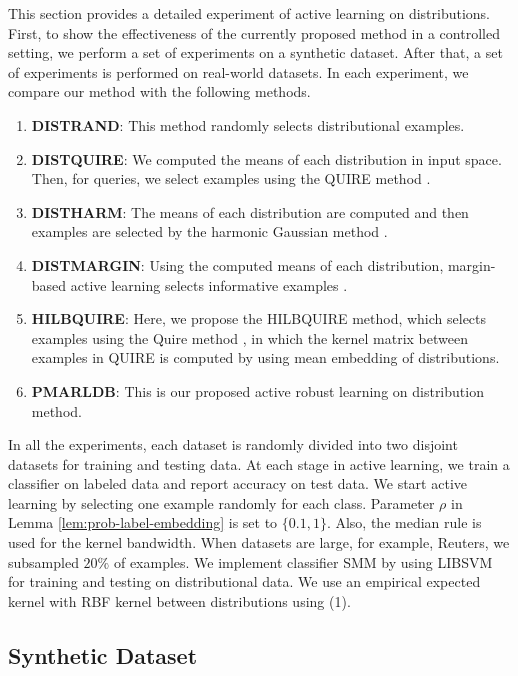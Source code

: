 \documentclass[10pt,twocolumn]{IEEEtran}
\begin{document}
	This section provides a detailed experiment of active learning on distributions. First, to show the effectiveness of the currently proposed method in a controlled setting, we perform a set of experiments on a synthetic dataset. After that, a set of experiments is performed on real-world datasets. In each experiment, we compare our method with the following methods.
	\begin{enumerate}
		\item \textbf{DISTRAND}: This method randomly selects distributional examples.
		\item \textbf{DISTQUIRE}: We computed the means of each distribution in input space. Then, for queries, we select examples using the QUIRE method \cite{huang2014active}.
		\item \textbf{DISTHARM}: The means of each distribution are computed and then examples are selected by the harmonic Gaussian method \cite{zhu2003semi}.
		\item \textbf{DISTMARGIN}: Using the computed means of each distribution, margin-based active learning selects informative examples \cite{tong2001support}.
		\item \textbf{HILBQUIRE}: Here, we propose the HILBQUIRE method, which selects examples using the Quire method \cite{huang2014active}, in which the kernel matrix between examples in QUIRE is computed by using mean embedding of distributions.
		\item \textbf{PMARLDB}: This is our proposed active robust learning on distribution method.
	\end{enumerate}
	
	In all the experiments, each dataset is randomly divided into two disjoint datasets for training and testing data. At each stage in active learning, we train a classifier on labeled data and report accuracy on test data. We start active learning by selecting one example randomly for each class. Parameter $\rho$ in Lemma \ref{lem:prob-label-embedding} is set to $\{0.1, 1\}$. Also, the median rule is used for the kernel bandwidth. When datasets are large, for example, Reuters, we subsampled $20\%$ of examples. We implement classifier SMM \cite{muandet2012learning} by using LIBSVM \cite{chang2011libsvm} for training and testing on distributional data. We use an empirical expected kernel with RBF kernel between distributions using (1).
	
	\subsection{Synthetic Dataset}
	
\end{document}

